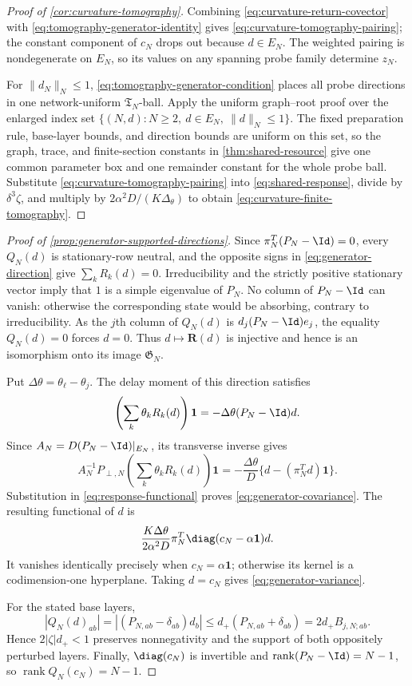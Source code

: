 \begin{proof}[Proof of \cref{cor:curvature-tomography}]
Combining \cref{eq:curvature-return-covector} with
\cref{eq:tomography-generator-identity} gives
\cref{eq:curvature-tomography-pairing}; the constant component of \(c_N\)
drops out because \(d\in E_N\).  The weighted pairing is nondegenerate on
\(E_N\), so its values on any spanning probe family determine \(z_N\).

For \(\|d_N\|_N\le1\),
\cref{eq:tomography-generator-condition} places all probe directions in one
network-uniform \(\mathfrak T_N\)-ball.  Apply the uniform graph--root proof
over the enlarged index set
\(\{(N,d):N\ge2,\ d\in E_N,\ \|d\|_N\le1\}\).  The fixed preparation rule,
base-layer bounds, and direction bounds are uniform on this set, so the graph,
trace, and finite-section constants in \cref{thm:shared-resource} give one
common parameter box and one remainder constant for the whole probe ball.
Substitute
\cref{eq:curvature-tomography-pairing} into
\cref{eq:shared-response}, divide by \(\delta^3\zeta\), and multiply by
\(2\alpha^2D/(K\Delta_\theta)\) to obtain
\cref{eq:curvature-finite-tomography}.
\end{proof}

\begin{proof}[Proof of \cref{prop:generator-supported-directions}]
Since \(\pi_N^T(P_N-\Id)=0\), every \(Q_N(d)\) is stationary-row
neutral, and the opposite signs in
\cref{eq:generator-direction} give
\(\sum_kR_k(d)=0\).  Irreducibility and the strictly positive stationary
vector imply that \(1\) is a simple eigenvalue of \(P_N\).  No column of
\(P_N-\Id\) can vanish: otherwise the corresponding state would be absorbing,
contrary to irreducibility.  As the \(j\)th column of \(Q_N(d)\) is
\(d_j(P_N-\Id)e_j\), the equality \(Q_N(d)=0\) forces \(d=0\).
Thus \(d\mapsto\mathbf R(d)\) is injective and hence is an isomorphism onto
its image \(\mathfrak G_N\).

Put \(\Delta\theta=\theta_\ell-\theta_j\).  The delay moment of this
direction satisfies
\[
 \left(\sum_k\theta_kR_k(d)\right)\mathbf1
 =-\Delta\theta(P_N-\Id)d.
\]
Since \(A_N=D(P_N-\Id)|_{E_N}\), its transverse inverse gives
\[
 A_N^{-1}P_{\perp,N}
 \left(\sum_k\theta_kR_k(d)\right)\mathbf1
 =-\frac{\Delta\theta}{D}
       \{d-(\pi_N^Td)\mathbf1\}.
\]
Substitution in \cref{eq:response-functional} proves
\cref{eq:generator-covariance}.  The resulting functional of \(d\) is
\[
 \frac{K\Delta\theta}{2\alpha^2D}
 \pi_N^T\diag(c_N-\alpha\mathbf1)d.
\]
It vanishes identically precisely when \(c_N=\alpha\mathbf1\); otherwise its
kernel is a codimension-one hyperplane.  Taking \(d=c_N\) gives
\cref{eq:generator-variance}.

For the stated base layers,
\[
 |Q_N(d)_{ab}|
 =|(P_{N,ab}-\delta_{ab})d_b|
 \le d_+(P_{N,ab}+\delta_{ab})
 =2d_+B_{j,N;ab}.
\]
Hence \(2|\zeta|d_+<1\) preserves nonnegativity and the support of both
oppositely perturbed layers.  Finally,
\(\diag(c_N)\) is invertible and
\(\operatorname{rank}(P_N-\Id)=N-1\), so
\(\operatorname{rank}Q_N(c_N)=N-1\).
\end{proof}

